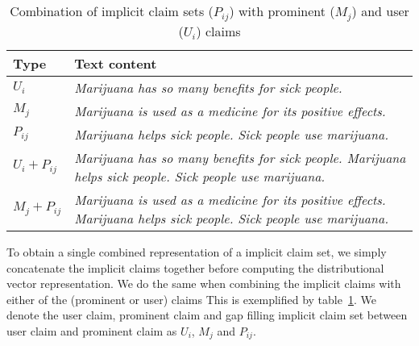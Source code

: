 \begin{table}
\begin{center}
{\small
{\def\arraystretch{1.2}\tabcolsep=2pt
\begin{tabular}{@{}lp{13cm}@{}}
\toprule
Type & Text content  \\
\midrule
$U_i$      & \emph{Marijuana has so many benefits for sick people.} \\
$M_j$    & \emph{Marijuana is used as a medicine for its positive effects.}   \\
$P_{ij}$     & \emph{Marijuana helps sick people. Sick people use marijuana.} \\
\midrule
$U_i + P_{ij}$   & \emph{Marijuana has so many benefits for sick people.
Marijuana helps sick people. Sick people use marijuana.} \\ 
$M_j + P_{ij}$   & \emph{Marijuana is used as a medicine for its positive
effects. Marijuana helps sick people. Sick people use marijuana.}\\
\bottomrule
\end{tabular}}}
	\caption{Combination of implicit claim sets ($P_{ij}$) with  prominent
	($M_j$) and user ($U_i$) claims}
\label{tab:argpremise_concatenation}
\end{center}
\end{table}

To obtain a single combined representation of a implicit claim set, we simply
concatenate the implicit claims together before computing the distributional vector
representation. 
We do the same when combining the implicit claims  with either of the (prominent or user) claims
This is exemplified by table~\ref{tab:argpremise_concatenation}. 
We denote the user claim, prominent claim and gap filling implicit claim set between 
user claim and prominent claim as
$U_i$, $M_j$ and $P_{ij}$. 


